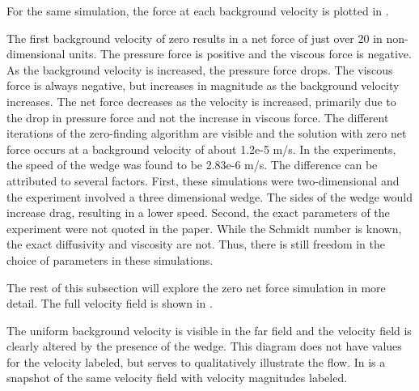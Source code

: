 \documentclass[12pt]{article}
\begin{document}
For the same simulation, the force at each background velocity is plotted in .


The first background velocity of zero results in a net force of just over 20 in non-dimensional units. The pressure force is positive and the viscous force is negative. As the background velocity is increased, the pressure force drops. The viscous force is always negative, but increases in magnitude as the background velocity increases. The net force decreases as the velocity is increased, primarily due to the drop in pressure force and not the increase in viscous force. The different iterations of the zero-finding algorithm are visible and the solution with zero net force occurs at a background velocity of about 1.2e-5 m/s. In the experiments, the speed of the wedge was found to be 2.83e-6 m/s. The difference can be attributed to several factors. First, these simulations were two-dimensional and the experiment involved a three dimensional wedge. The sides of the wedge would increase drag, resulting in a lower speed. Second, the exact parameters of the experiment were not quoted in the paper. While the Schmidt number is known, the exact diffusivity and viscosity are not. Thus, there is still freedom in the choice of parameters in these simulations.

The rest of this subsection will explore the zero net force simulation in more detail. The full velocity field is shown in .


The uniform background velocity is visible in the far field and the velocity field is clearly altered by the presence of the wedge. This diagram does not have values for the velocity labeled, but serves to qualitatively illustrate the flow. In  is a snapshot of the same velocity field with velocity magnitudes labeled.

\end{document}
